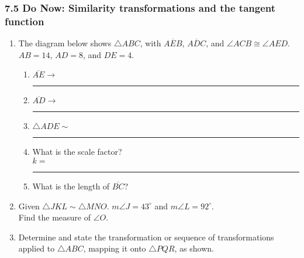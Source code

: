 \documentclass[12pt, twoside]{article}
\begin{document}
\subsubsection*{7.5 Do Now: Similarity transformations and the tangent function}
  \begin{enumerate}
  \item The diagram below shows $\triangle ABC$, with $\overline{AEB}$, $\overline{ADC}$, and $\angle ACB \cong \angle AED$. $AB=14$, $AD=8$, and $DE=4$.
  \begin{multicols}{2}
    \begin{enumerate}
        \item $\overline{AE} \rightarrow$ \rule{2cm}{0.15mm} \vspace{0.5cm}
        \item $\overline{AD} \rightarrow$ \rule{2cm}{0.15mm} \vspace{0.5cm}
        \item $\triangle ADE \sim$ \rule{2cm}{0.15mm} \vspace{0.5cm}
        \item What is the scale factor?\\[0.5cm] $k=$  \rule{2cm}{0.15mm}
        \item What is the length of $\overline{BC}$?
      \end{enumerate}
    \end{multicols} \vspace{1.5cm}
 
   \item Given $\triangle JKL \sim \triangle MNO$. $m\angle J = 43^\circ$ and $m\angle L = 92^\circ$.\\[0.25cm]
   Find the measure of $\angle O$. \vspace{1.cm}

   \item Determine and state the transformation or sequence of transformations  applied to $\triangle ABC$, mapping it onto $\triangle PQR$, as shown.
   \begin{flushright}
\end{flushright}
\end{enumerate}
\end{document}
